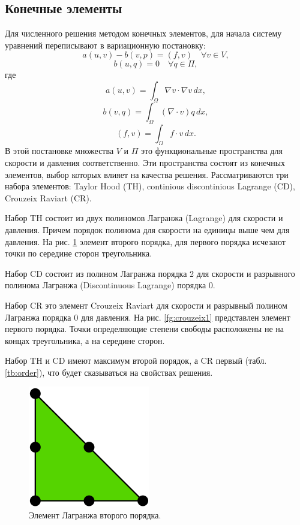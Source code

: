 \documentclass[12pt]{article}
\begin{document}
\subsection{Конечные элементы}
Для численного решения методом конечных элементов, для начала систему уравнений переписывают в вариационную постановку:
\begin{equation}
a(u,v)-b(v,p)=(f,v) \quad \forall v \in V,
\end{equation}
\begin{equation}
b(u,q)=0 \quad \forall q \in \Pi,
\end{equation}
где 
\begin{equation}
a(u,v)=\int_\Omega \nabla v \cdot \nabla v \, dx,
\end{equation}
\begin{equation}
b(v,q)=\int_\Omega (\nabla \cdot v) q \, dx,
\end{equation}
\begin{equation}
(f,v)=\int_\Omega f \cdot v \, dx.
\end{equation}
В этой постановке множества $V$ и $\Pi$ это функциональные пространства для скорости и давления соответственно. Эти пространства состоят из конечных элементов, выбор которых влияет на качества решения. Рассматриваются три набора элементов: Taylor Hood (TH), continious discontinious Lagrange (CD), Crouzeix Raviart (CR). 

Набор TH состоит из двух полиномов Лагранжа (Lagrange) для скорости и давления. Причем порядок полинома для скорости на единицы выше чем для давления. На рис. \ref{fg:lagrange2} элемент второго порядка, для первого порядка исчезают точки по середине сторон треугольника.

Набор CD состоит из полином Лагранжа порядка 2 для скорости и разрывного полинома Лагранжа (Discontinuous Lagrange) порядка 0.

Набор CR это элемент Crouzeix Raviart для скорости и разрывный полином Лагранжа порядка 0 для давления. На рис. \ref{fg:crouzeix1} представлен элемент первого порядка. Точки определяющие степени свободы расположены не на концах треугольника, а на середине сторон.

Набор TH и CD имеют максимум второй порядок, а CR первый (табл. \ref{tb:order}), что будет сказываться на свойствах решения.

\begin{figure}
	\begin{center}
		\includegraphics[width=200px]{pics/lagrange2}
		\caption{Элемент Лагранжа второго порядка.}
		\label{fg:lagrange2}
	\end{center}
\end{figure}
\end{document}

